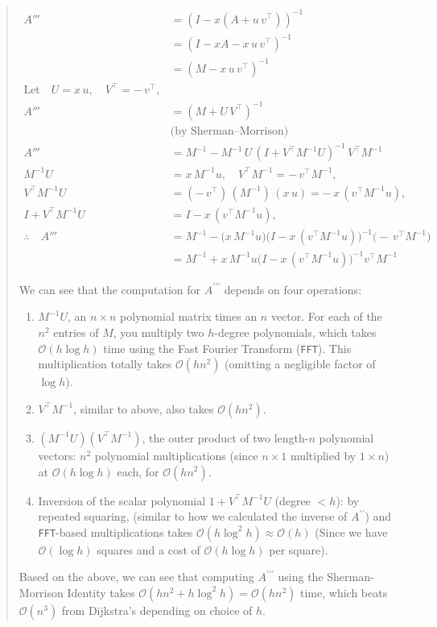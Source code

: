 \documentclass[12pt]{article}
\newcommand{\bigO}{\mathcal{O}}
\begin{document}
\begin{quote}
    \begin{align*}
        A'''
        &= (I - x(A + u\,v^{\top}))^{-1} \\
        &= (I - xA - x\,u\,v^{\top})^{-1} \\
        &= (M - x\,u\,v^{\top})^{-1} \\[6pt]
        \text{Let}\quad U = x\,u,\quad V^{\top} = -\,v^{\top}, & \\[3pt]
        A'''
        &= (M + U\,V^{\top})^{-1} \\
        &\text{(by Sherman–Morrison)} \\[3pt]
        A'''
        &= M^{-1}
        - M^{-1}\,U\,(I + V^{\top}M^{-1}U)^{-1}\,V^{\top}M^{-1} \\[6pt]
        M^{-1}U
        &= x\,M^{-1}u,
        \quad
        V^{\top}M^{-1}
        = -\,v^{\top}M^{-1}, \\[3pt]
        V^{\top}M^{-1}U
        &= (-\,v^{\top})\,(M^{-1})\,(x\,u)
        = -\,x\,(v^{\top}M^{-1}u), \\[3pt]
        I + V^{\top}M^{-1}U
        &= I - x\,(v^{\top}M^{-1}u), \\[6pt]
        \therefore\quad
        A'''
        &= M^{-1}
        - \bigl(x\,M^{-1}u\bigr)
        \bigl(I - x\,(v^{\top}M^{-1}u)\bigr)^{-1}
        \bigl(-\,v^{\top}M^{-1}\bigr) \\[3pt]
        &= M^{-1}
        + x\,M^{-1}u
        \bigl(I - x\,(v^{\top}M^{-1}u)\bigr)^{-1}
        v^{\top}M^{-1}
    \end{align*}

    We can see that the computation for $A^{\prime \prime \prime}$ depends on four operations:

    \begin{enumerate}
        \item $M^{-1} U$, an $n \times n$ polynomial matrix times an $n$ vector. For each of the $n^2$ entries of $M$, you multiply two $h$-degree polynomials, which takes $\bigO(h \log h)$ time using the Fast Fourier Transform (\texttt{FFT}). This multiplication totally takes $\bigO(h n^2)$ (omitting a negligible factor of $\log h$).
        \item $V^{\top} M^{-1}$, similar to above, also takes $\bigO(h n^2)$.
        \item $(M^{-1} U)(V^{\top} M^{-1})$, the outer product of two length-$n$ polynomial vectors: $n^2$ polynomial multiplications (since $n \times 1$ multiplied by $1 \times n$) at $\bigO(h \log h)$ each, for $\bigO(h n^2)$.
        \item Inversion of the scalar polynomial $1 + V^{\top} M^{-1} U$ (degree $<h$): by repeated squaring, (similar to how we calculated the inverse of $A^{\prime \prime}$) and \texttt{FFT}-based multiplications takes $\bigO(h \log^2 h) \approx \bigO(h)$ (Since we have $\bigO(\log h)$ squares and a cost of $\bigO(h \log h)$ per square).
    \end{enumerate}

    Based on the above, we can see that computing $A^{\prime \prime \prime}$ using the Sherman-Morrison Identity takes $\bigO(h n^2 + h \log^2 h) = \bigO(h n^2)$ time, which beats $\bigO(n^3)$ from Dijkstra's depending on choice of $h$.
\end{quote}
\end{document}
